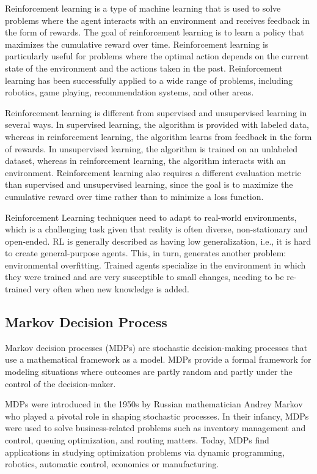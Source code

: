 Reinforcement learning is a type of machine learning that is used to solve problems where the agent interacts with an environment and receives feedback in the form of rewards. The goal of reinforcement learning is to learn a policy that maximizes the cumulative reward over time. Reinforcement learning is particularly useful for problems where the optimal action depends on the current state of the environment and the actions taken in the past. Reinforcement learning has been successfully applied to a wide range of problems, including robotics\cite{}, game playing\cite{}, recommendation systems\cite{}, and other areas.

Reinforcement learning is different from supervised and unsupervised learning in several ways. In supervised learning, the algorithm is provided with labeled data, whereas in reinforcement learning, the algorithm learns from feedback in the form of rewards. In unsupervised learning, the algorithm is trained on an unlabeled dataset, whereas in reinforcement learning, the algorithm interacts with an environment. Reinforcement learning also requires a different evaluation metric than supervised and unsupervised learning, since the goal is to maximize the cumulative reward over time rather than to minimize a loss function.

Reinforcement Learning techniques need to adapt to real-world environments, which is a challenging task given that reality is often diverse, non-stationary and open-ended. RL is generally described as having low generalization, i.e., it is hard to create general-purpose agents. This, in turn, generates another problem: environmental overfitting. Trained agents specialize in the environment in which they were trained and are very susceptible to small changes, needing to be re-trained very often when new knowledge is added\cite{}.

\subsection*{Markov Decision Process}
Markov decision processes (MDPs) are stochastic decision-making processes that use a mathematical framework as a model. MDPs provide a formal framework for modeling situations where outcomes are partly random and partly under the control of the decision-maker. 

MDPs were introduced in the 1950s by Russian mathematician Andrey Markov who played a pivotal role in shaping stochastic processes. In their infancy, MDPs were used to solve business-related problems such as inventory management and control, queuing optimization, and routing matters. Today, MDPs find applications in studying optimization problems via dynamic programming, robotics, automatic control, economics or manufacturing.

